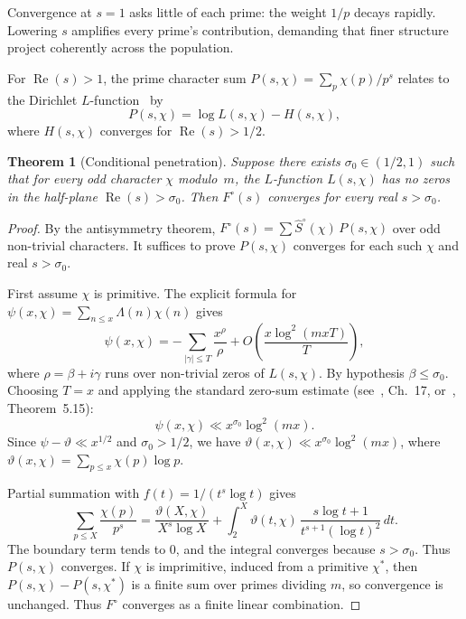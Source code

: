 \documentclass[12pt]{amsart}
\newtheorem{theorem}{Theorem}
\theoremstyle{definition}
\theoremstyle{remark}
\begin{document}
Convergence at $s = 1$ asks little of each prime: the
weight $1/p$ decays rapidly. Lowering $s$ amplifies
every prime's contribution, demanding that finer
structure project coherently across the population.

For $\operatorname{Re}(s) > 1$, the prime character sum
$P(s, \chi) = \sum_p \chi(p)/p^s$ relates to the
Dirichlet $L$-function~\cite{davenport,iwaniec} by
\[
P(s, \chi) = \log L(s, \chi) - H(s, \chi),
\]
where $H(s, \chi)$ converges for
$\operatorname{Re}(s) > 1/2$.

\begin{theorem}[Conditional penetration]
\label{thm:penetration}
Suppose there exists $\sigma_0 \in (1/2, 1)$ such
that for every odd character $\chi$ modulo~$m$, the
$L$-function $L(s, \chi)$ has no zeros in the
half-plane $\operatorname{Re}(s) > \sigma_0$. Then
$F^{\circ}(s)$ converges for every real $s > \sigma_0$.
\end{theorem}

\begin{proof}
By the antisymmetry theorem,
$F^{\circ}(s) = \sum \hat{S}^{\circ}(\chi)\, P(s, \chi)$
over odd non-trivial characters. It suffices to prove
$P(s, \chi)$ converges for each such $\chi$ and real
$s > \sigma_0$.

First assume $\chi$ is primitive. The explicit formula for
$\psi(x, \chi) = \sum_{n \le x} \Lambda(n)\chi(n)$
gives~\cite{davenport,iwaniec}
\[
\psi(x, \chi) = -\sum_{|\gamma| \le T}
\frac{x^{\rho}}{\rho}
+ O\!\left(\frac{x \log^2(mxT)}{T}\right),
\]
where $\rho = \beta + i\gamma$ runs over non-trivial
zeros of $L(s, \chi)$. By hypothesis $\beta \le \sigma_0$.
Choosing $T = x$ and applying the standard zero-sum
estimate (see~\cite{davenport}, Ch.~17,
or~\cite{iwaniec}, Theorem~5.15):
\[
\psi(x, \chi) \ll x^{\sigma_0} \log^2(mx).
\]
Since $\psi - \vartheta \ll x^{1/2}$ and
$\sigma_0 > 1/2$, we have
$\vartheta(x, \chi) \ll x^{\sigma_0} \log^2(mx)$,
where $\vartheta(x, \chi) = \sum_{p \le x}
\chi(p) \log p$.

Partial summation with
$f(t) = 1/(t^s \log t)$ gives
\[
\sum_{p \le X} \frac{\chi(p)}{p^s}
= \frac{\vartheta(X, \chi)}{X^s \log X}
+ \int_2^X \vartheta(t, \chi)\,
\frac{s \log t + 1}{t^{s+1} (\log t)^2}\, dt.
\]
The boundary term tends to $0$, and the integral
converges because $s > \sigma_0$. Thus $P(s, \chi)$
converges. If $\chi$ is imprimitive, induced from a
primitive $\chi^{*}$, then
$P(s, \chi) - P(s, \chi^{*})$ is a finite sum over
primes dividing $m$, so convergence is unchanged.
Thus $F^{\circ}$ converges as a finite linear
combination.
\end{proof}
\end{document}
